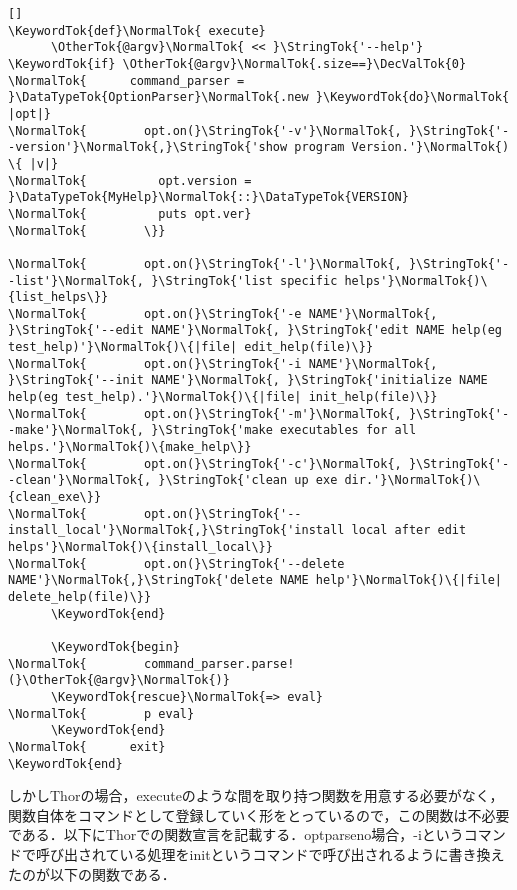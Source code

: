 \documentclass[11pt,dvipdfmx]{jsarticle}
\newcommand{\KeywordTok}[1]{\textcolor[rgb]{0.00,0.44,0.13}{\textbf{{#1}}}}
\newcommand{\DataTypeTok}[1]{\textcolor[rgb]{0.56,0.13,0.00}{{#1}}}
\newcommand{\DecValTok}[1]{\textcolor[rgb]{0.25,0.63,0.44}{{#1}}}
\newcommand{\StringTok}[1]{\textcolor[rgb]{0.25,0.44,0.63}{{#1}}}
\newcommand{\OtherTok}[1]{\textcolor[rgb]{0.00,0.44,0.13}{{#1}}}
\newcommand{\NormalTok}[1]{{#1}}
\begin{document}
\begin{screen}
{\small
\begin{verbatim}[]
\KeywordTok{def}\NormalTok{ execute}
      \OtherTok{@argv}\NormalTok{ << }\StringTok{'--help'} \KeywordTok{if} \OtherTok{@argv}\NormalTok{.size==}\DecValTok{0}
\NormalTok{      command_parser = }\DataTypeTok{OptionParser}\NormalTok{.new }\KeywordTok{do}\NormalTok{ |opt|}
\NormalTok{        opt.on(}\StringTok{'-v'}\NormalTok{, }\StringTok{'--version'}\NormalTok{,}\StringTok{'show program Version.'}\NormalTok{) \{ |v|}
\NormalTok{          opt.version = }\DataTypeTok{MyHelp}\NormalTok{::}\DataTypeTok{VERSION}
\NormalTok{          puts opt.ver}
\NormalTok{        \}}
        
\NormalTok{        opt.on(}\StringTok{'-l'}\NormalTok{, }\StringTok{'--list'}\NormalTok{, }\StringTok{'list specific helps'}\NormalTok{)\{list_helps\}}
\NormalTok{        opt.on(}\StringTok{'-e NAME'}\NormalTok{, }\StringTok{'--edit NAME'}\NormalTok{, }\StringTok{'edit NAME help(eg test_help)'}\NormalTok{)\{|file| edit_help(file)\}}
\NormalTok{        opt.on(}\StringTok{'-i NAME'}\NormalTok{, }\StringTok{'--init NAME'}\NormalTok{, }\StringTok{'initialize NAME help(eg test_help).'}\NormalTok{)\{|file| init_help(file)\}}
\NormalTok{        opt.on(}\StringTok{'-m'}\NormalTok{, }\StringTok{'--make'}\NormalTok{, }\StringTok{'make executables for all helps.'}\NormalTok{)\{make_help\}}
\NormalTok{        opt.on(}\StringTok{'-c'}\NormalTok{, }\StringTok{'--clean'}\NormalTok{, }\StringTok{'clean up exe dir.'}\NormalTok{)\{clean_exe\}}
\NormalTok{        opt.on(}\StringTok{'--install_local'}\NormalTok{,}\StringTok{'install local after edit helps'}\NormalTok{)\{install_local\}}
\NormalTok{        opt.on(}\StringTok{'--delete NAME'}\NormalTok{,}\StringTok{'delete NAME help'}\NormalTok{)\{|file| delete_help(file)\}}
      \KeywordTok{end}
      
      \KeywordTok{begin}
\NormalTok{        command_parser.parse!(}\OtherTok{@argv}\NormalTok{)}
      \KeywordTok{rescue}\NormalTok{=> eval}
\NormalTok{        p eval}
      \KeywordTok{end}
\NormalTok{      exit}
\KeywordTok{end}
\end{verbatim}}
\end{screen}

しかしThorの場合，executeのような間を取り持つ関数を用意する必要がなく，関数自体をコマンドとして登録していく形をとっているので，この関数は不必要である．以下にThorでの関数宣言を記載する．optparseno場合，-iというコマンドで呼び出されている処理をinitというコマンドで呼び出されるように書き換えたのが以下の関数である．
\end{document}
